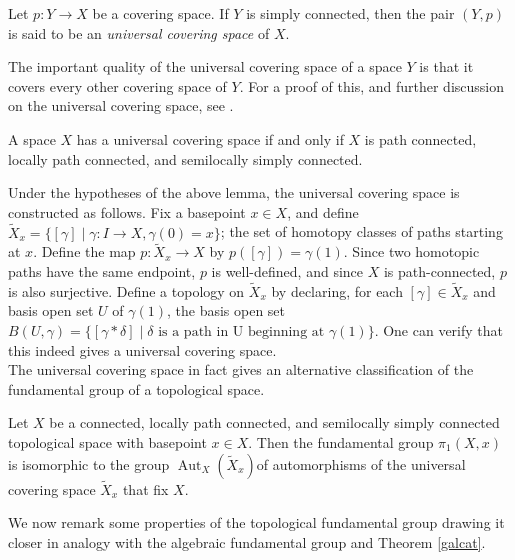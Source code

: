 \documentclass[11pt,openany]{book} %
\newcommand{\Aut}{\operatorname{Aut}}
\begin{document}
\begin{definition}
Let $p : Y \to X$ be a covering space. If $Y$ is simply connected, then the pair $(Y,p)$ is said to be an \emph{universal covering space} of $X$.
\end{definition}

The important quality of the universal covering space of a space $Y$ is that it covers every other covering space of $Y$. For a proof of this, and further discussion on the universal covering space, see \cite{munkres}.\\

\begin{lemma}
A space $X$ has a universal covering space if and only if $X$ is path connected, locally path connected, and semilocally simply connected.
\end{lemma}
\medskip

Under the hypotheses of the above lemma, the universal covering space is constructed as follows. Fix a basepoint $x \in X$, and define $\tilde{X}_x = \{[\gamma] \mid \gamma : I \to X, \gamma(0) = x\}$; the  set of homotopy classes of paths starting at $x$. Define the map $p : \tilde{X}_x \to X$ by $p([\gamma]) = \gamma(1)$. Since two homotopic paths have the same endpoint, $p$ is well-defined, and since $X$ is path-connected, $p$ is also surjective. Define a topology on $\tilde{X}_x$ by declaring, for each $[\gamma] \in \tilde{X}_x$ and basis open set $U$ of $\gamma(1)$, the basis open set $B(U,\gamma) = \{[\gamma * \delta] \mid \delta \text{ is a path in U beginning at } \gamma(1)\}$. One can verify that this indeed gives a universal covering space.\\

The universal covering space in fact gives an alternative classification of the fundamental group of a topological space.\\

\begin{proposition}
Let $X$ be a connected, locally path connected, and semilocally simply connected topological space with basepoint $x \in X$. Then the fundamental group $\pi_1(X,x)$ is isomorphic to the group $\Aut_X(\tilde{X}_x)$of automorphisms of the universal covering space $\tilde{X}_x$ that fix $X$.
\end{proposition}
\medskip

We now remark some properties of the topological fundamental group drawing it closer in analogy with the algebraic fundamental group and Theorem \ref{galcat}.\\
\end{document}
